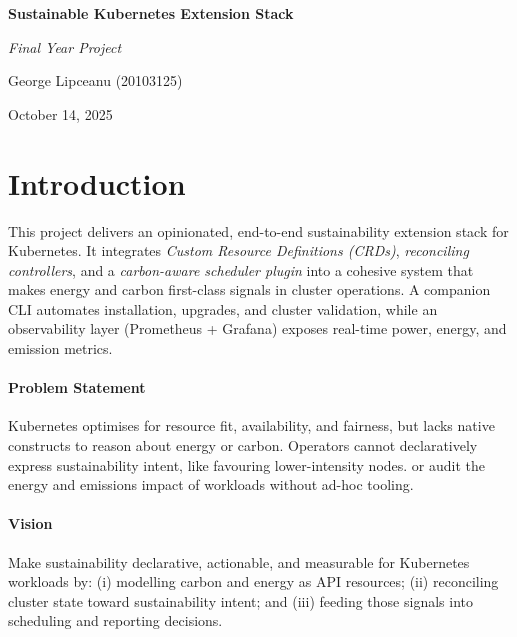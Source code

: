\documentclass{article}
\author{George Lipceanu (20103125)}
\date{October 14., 2025}
\begin{document}
\begin{titlepage}
    \centering
    
    \vspace*{2cm}
    
    {\Huge \textbf{Sustainable Kubernetes Extension Stack} \par}
    \vspace{1cm}
    {\Large \textit{Final Year Project}\par}
    \vspace{1.5cm}
    
    {\Large George Lipceanu (20103125)\par}
    \vspace{0.5cm}
    
    {\large October 14, 2025\par}
    
    \vspace{3cm}
    
    \tableofcontents
    
    \vfill
\end{titlepage}


\newpage         

\section{Introduction}
This project delivers an opinionated, end-to-end sustainability extension stack for Kubernetes. It integrates
\emph{Custom Resource Definitions (CRDs)}, \emph{reconciling controllers}, and a \emph{carbon-aware scheduler plugin}
into a cohesive system that makes energy and carbon first-class signals in cluster operations. A companion CLI
 automates installation, upgrades, and cluster validation, while an observability layer
(Prometheus + Grafana) exposes real-time power, energy, and emission metrics.

\paragraph{Problem Statement}
Kubernetes optimises for resource fit, availability, and fairness, 
but lacks native constructs to reason about energy or carbon. Operators 
cannot declaratively express sustainability intent, like favouring lower-intensity nodes. 
or audit the energy and emissions impact of workloads without ad-hoc tooling.

\paragraph{Vision}
Make sustainability declarative, actionable, and measurable for Kubernetes workloads by:
(i) modelling carbon and energy as API resources; (ii) reconciling cluster state toward sustainability intent; and
(iii) feeding those signals into scheduling and reporting decisions.
\end{document}

